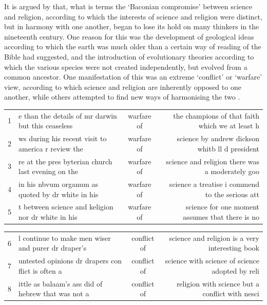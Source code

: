 \documentclass{article}
\begin{document}
It is argued by \cite{moore} that, what is terms the `Baconian compromise' between science and religion, according to which the interests of science and religion were distinct, but in harmony with one another, began to lose its hold on many thinkers in the nineteenth century. One reason for this was the development of geological ideas according to which the earth was much older than a certain way of reading of the Bible had suggested, and the introduction of evolutionary theories according to which the various species were not created independently, but evolved from a common ancestor. One manifestation of this was an extreme `conflict' or `warfare' view, according to which science and religion are inherently opposed to one another, while others attempted to find new ways of harmonising the two \cite{dupree}.

\begin{table}[]
        \scriptsize
        \centering
        \begin{tabular}{l|lcr}
        1 & e than the details of mr darwin but this ceaseless & warfare of & the champions of that faith which we at least h \\
        2 & ws during his recent visit to america r review the & warfare of & science by andrew dickson whitb ll d president \\
        3 & re at the pres byterian church last evening on the & warfare of & science and religion there was a moderately goo \\
        4 & in his nbvum organum as quoted by dr white in his & warfare of & science a treatise i commend to the serious att \\
        5 & t between science and keligion nor dr white in his & warfare of & science for one moment assumes tbat there is no \\
      \end{tabular}
      \begin{tabular}{l|lcr}
        6 & l continue to make men wiser and purer dr draper's & conflict of & science and religion is a very interesting book \\
        7 & untested opinions dr drapers con flict is often a & conflict of & science with science of science adopted by reli \\
        8 & ittle as balaam's ass did of hebrew that was not a & conflict of & religion with science but a conflict with nesci \\
        \end{tabular}
        \begin{tabular}{l|lcr}

\end{tabular}
\end{table}
\end{document}
